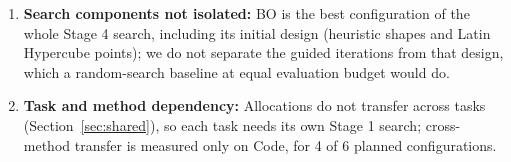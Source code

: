 \documentclass[11pt]{article}
\begin{document}
\begin{enumerate}
\item \textbf{Search components not isolated:} BO is the best configuration of the whole Stage 4 search, including its initial design (heuristic shapes and Latin Hypercube points); we do not separate the guided iterations from that design, which a random-search baseline at equal evaluation budget would do.
\item \textbf{Task and method dependency:} Allocations do not transfer across tasks (Section~\ref{sec:shared}), so each task needs its own Stage 1 search; cross-method transfer is measured only on Code, for 4 of 6 planned configurations.
\end{enumerate}

\FloatBarrier




\end{document}
